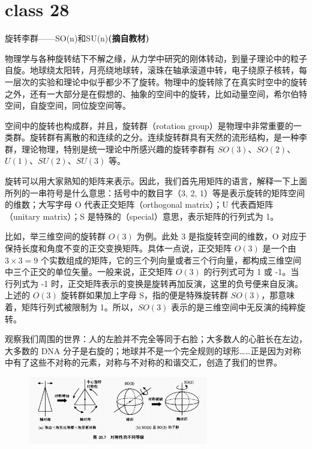 \documentclass[12pt, a4paper, oneside, UTF8]{ctexbook}  %
\begin{document}
\section{class 28}
\begin{add}
    旋转李群——SO(n)和SU(n)\textbf{(摘自教材)}

物理学与各种旋转结下不解之缘，从力学中研究的刚体转动，到量子理论中的粒子自旋。地球绕太阳转，月亮绕地球转，滚珠在轴承滚道中转，电子绕原子核转，每一层次的实验和理论中似乎都少不了旋转。物理中的旋转除了在真实时空中的旋转之外，还有一大部分是在假想的、抽象的空间中的旋转，比如动量空间，希尔伯特空间，自旋空间，同位旋空间等。

空间中的旋转也构成群，并且，旋转群（rotation group）是物理中非常重要的一类群。旋转群有离散的和连续的之分。连续旋转群具有天然的流形结构，是一种李群，理论物理，特别是统一理论中所感兴趣的旋转李群有 \(SO(3)\)、\(SO(2)\)、\(U(1)\)、\(SU(2)\)、\(SU(3)\) 等。

旋转可以用大家熟知的矩阵来表示。因此，我们首先用矩阵的语言，解释一下上面所列的一串符号是什么意思：括号中的数目字（3, 2, 1）等是表示旋转的矩阵空间的维数；大写字母 O 代表正交矩阵（orthogonal matrix）；U 代表酉矩阵（unitary matrix）；S 是特殊的（special）意思，表示矩阵的行列式为 1。

比如，举三维空间的旋转群 \(O(3)\) 为例。此处 3 是指旋转空间的维数，O 对应于保持长度和角度不变的正交变换矩阵。具体一点说，正交矩阵 \(O(3)\) 是一个由 \(3 \times 3 = 9\) 个实数组成的矩阵，它的三个列向量或者三个行向量，都构成三维空间中三个正交的单位矢量。一般来说，正交矩阵 \(O(3)\) 的行列式可为 1 或 -1。当行列式为 -1 时，正交矩阵表示的变换是旋转再加反演，这里的负号便来自反演。上述的 \(O(3)\) 旋转群如果加上字母 S，指的便是特殊旋转群 \(SO(3)\)，那意味着，矩阵行列式被限制为 1。所以，\(SO(3)\) 表示的是三维空间中无反演的纯粹旋转。

观察我们周围的世界：人的左脸并不完全等同于右脸；大多数人的心脏长在左边，大多数的 DNA 分子是右旋的；地球并不是一个完全规则的球形……正是因为对称中有了这些不对称的元素，对称与不对称的和谐交汇，创造了我们的世界。

\begin{figure}[h]
\centering
\includegraphics[width=0.7\textwidth, keepaspectratio]{chap4/20.7.png}
\label{image20.7}
\end{figure}


\end{add}
\end{document}
